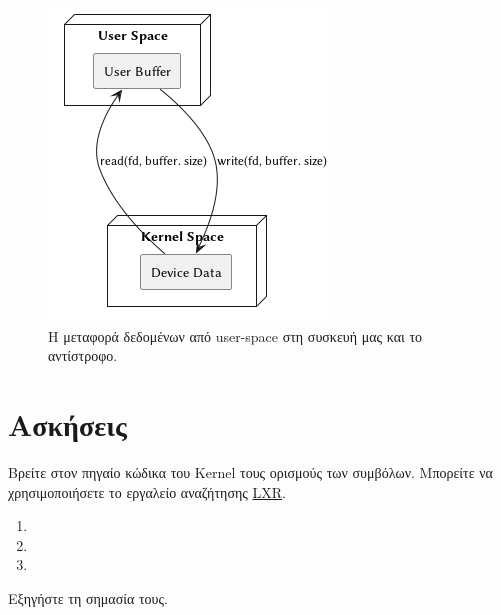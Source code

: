 \documentclass[18pt]{extarticle}
\begin{document}
\begin{figure}[H]
    \centering
    \includegraphics[width=.5\textwidth]{assets/mem-map.png}
    \caption{Η μεταφορά δεδομένων από user-space στη συσκευή μας και το αντίστροφο.}
    \label{fig:drivers}
\end{figure}

\section{Ασκήσεις}



\begin{question}
    Βρείτε στον πηγαίο κώδικα του Kernel τους ορισμούς των συμβόλων. Μπορείτε να χρησιμοποιήσετε το εργαλείο αναζήτησης \href{https://elixir.bootlin.com/linux/latest/source}{LXR}.
    \begin{enumerate}
        \item {}
        \item {}
        \item {}
    \end{enumerate}
   Εξηγήστε τη σημασία τους. 
\end{question}
\end{document}
